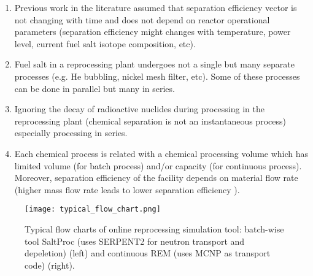 \begin{enumerate}
	\item Previous work in the literature assumed that separation 
efficiency vector is not changing with time and does not depend on reactor 
operational parameters (separation efficiency might changes with temperature, 
power level, current fuel salt isotope composition, etc).

	\item Fuel salt in a reprocessing plant undergoes not a single but many 
	separate processes (e.g. He bubbling, nickel mesh filter, etc). Some of 
	these processes can be done in parallel but many in series.
	
	\item Ignoring the decay of radioactive nuclides during processing in  
	the reprocessing plant (chemical separation is not an instantaneous process) 
	especially processing in series. 
	
	\item Each chemical process is related with a chemical processing volume 
	which has limited volume (for batch process) and/or capacity (for 
	continuous process). 
	Moreover, separation efficiency of the facility depends on material flow 
	rate (higher mass flow rate leads to lower separation efficiency 
	\cite{briggs_molten-salt_1969}).
\end{enumerate}

\begin{figure}[hbp!] %
  \texttt{[image: typical\_flow\_chart.png]}
  \caption{Typical flow charts of online reprocessing simulation tool:
  batch-wise tool SaltProc (uses SERPENT2 for neutron transport and 
  depeletion) \cite{rykhlevskii_modeling_2019}
   (left) and continuous  REM (uses MCNP as transport code) 
   \cite{heuer_simulation_2010} (right).} 
  \label{fig:typical_flow_chart}
\end{figure}

